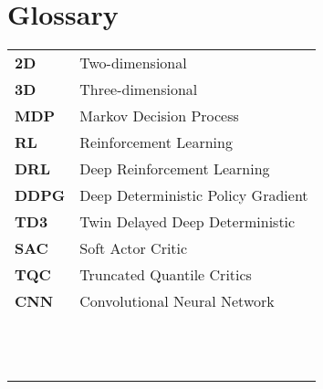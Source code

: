 %
\chapter*{Glossary}

\begin{table}[!hb]
    \begin{tabular}{ll}
        \textbf{2D}   & Two-dimensional                    \\
        \textbf{3D}   & Three-dimensional                  \\
        \textbf{MDP}  & Markov Decision Process            \\
        \textbf{RL}   & Reinforcement Learning             \\
        \textbf{DRL}  & Deep Reinforcement Learning        \\
        \textbf{DDPG} & Deep Deterministic Policy Gradient \\
        \textbf{TD3}  & Twin Delayed Deep Deterministic    \\
        \textbf{SAC}  & Soft Actor Critic                  \\
        \textbf{TQC}  & Truncated Quantile Critics         \\
        \textbf{CNN}  & Convolutional Neural Network       \\
        \textbf{}     &                                    \\
        \textbf{}     &                                    \\
        \textbf{}     &                                    \\
        \textbf{}     &                                    \\
        \textbf{}     &                                    \\
        \textbf{}     &                                    \\
        \textbf{}     &                                    \\
        \textbf{}     &                                    \\
        \textbf{}     &                                    \\
        \textbf{}     &                                    \\
        \textbf{}     &                                    \\
        \textbf{}     &                                    \\

\end{tabular}
\end{table}
